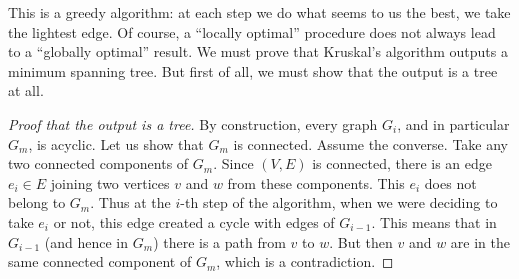 This is a greedy algorithm: at each step we do what seems to us the best, we take the lightest edge.
Of course, a ``locally optimal'' procedure does not always lead to a ``globally optimal'' result.
We must prove that Kruskal's algorithm outputs a minimum spanning tree.
But first of all, we must show that the output is a tree at all.

\begin{proof}[Proof that the output is a tree]
By construction, every graph $G_i$, and in particular $G_m$, is acyclic.
Let us show that $G_m$ is connected.
Assume the converse.
Take any two connected components of $G_m$.
Since $(V, E)$ is connected, there is an edge $e_i \in E$ joining two vertices $v$ and $w$ from these components.
This $e_i$ does not belong to $G_m$.
Thus at the $i$-th step of the algorithm, when we were deciding to take $e_i$ or not,
this edge created a cycle with edges of $G_{i-1}$.
This means that in $G_{i-1}$ (and hence in $G_m$) there is a path from $v$ to $w$.
But then $v$ and $w$ are in the same connected component of $G_m$, which is a contradiction.
\end{proof}

